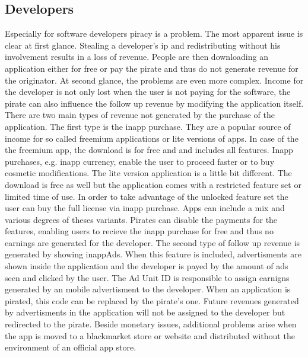 \subsection{Developers} \label{subsection:foundation-piracy-developers}
Especially for software developers piracy is a problem.
The most apparent issue is clear at first glance. Stealing a developer's \gls{ip} and redistributing without his involvement results in a loss of revenue.
People are then downloading an application either for free or pay the pirate and thus do not generate revenue for the originator.
\newline
At second glance, the problems are even more complex.
Income for the developer is not only lost when the user is not paying for the software, the pirate can also influence the follow up revenue by modifying the application itself.
There are two main types of revenue not generated by the purchase of the application.
The first type is the inapp purchase.
They are a popular source of income for so called freemium applications or lite versions of apps.
In case of the the freemium app, the download is for free and and includes all features. Inapp purchases, e.g. inapp currency, enable the user to proceed faster or to buy cosmetic modifications.
The lite version application is a little bit different. The download is free as well but the application comes with a restricted feature set or limited time of use.
In order to take advantage of the unlocked feature set the user can buy the full license via inapp purchase.
Apps can include a mix and various degrees of theses variants.
Pirates can disable the payments for the features, enabling users to recieve the inapp purchase for free and thus no earnings are generated for the developer.
\newline
The second type of follow up revenue is generated by showing inappAds.
When this feature is included, advertisments are shown inside the application and the developer is payed by the amount of ads seen and clicked by the user.
The Ad Unit ID \cite{googleAdmob} is responsible to assign earnigns generated by an mobile advertisment to the developer.
When an application is pirated, this code can be replaced by the pirate's one. Future revenues generated by advertisments in the application will not be assigned to the developer but redirected to the pirate.
\newline
\newline
Beside monetary issues, additional problems arise when the app is moved to a blackmarket store or website  and distributed without the environment of an official app store.
